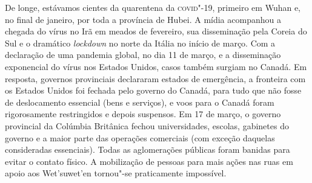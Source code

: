 De longe, estávamos cientes da quarentena da \textsc{covid}"-19, primeiro em Wuhan
e, no final de janeiro, por toda a província de Hubei. A mídia
acompanhou a chegada do vírus no Irã em meados de fevereiro, sua
disseminação pela Coreia do Sul e o dramático \emph{lockdown} no norte
da Itália no início de março. Com a declaração de uma pandemia global,
no dia 11 de março, e a disseminação exponencial do vírus nos Estados
Unidos, casos também surgiam no Canadá. Em resposta, governos
provinciais declararam estados de emergência, a fronteira com os Estados
Unidos foi fechada pelo governo do Canadá, para tudo que não fosse de
deslocamento essencial (bens e serviços), e voos para o Canadá foram
rigorosamente restringidos e depois suspensos. Em 17 de março, o governo
provincial da Colúmbia Britânica fechou universidades, escolas,
gabinetes do governo e a maior parte das operações comerciais (com
exceção daquelas consideradas essenciais). Todas as aglomerações
públicas foram banidas para evitar o contato físico. A mobilização de
pessoas para mais ações nas ruas em apoio aos Wet'suwet'en tornou"-se
praticamente impossível.

